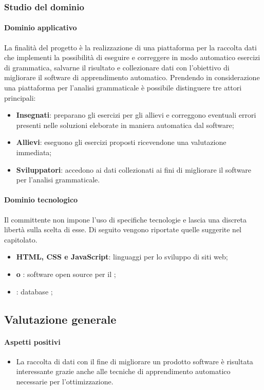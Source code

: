 	\subsubsection{Studio del dominio}
	\paragraph{Dominio applicativo} \Spazio
	La finalità del progetto è la realizzazione di una piattaforma per la raccolta dati che implementi la possibilità di eseguire e correggere in modo automatico esercizi di grammatica, salvarne il risultato e collezionare dati con l'obiettivo di migliorare il software di apprendimento automatico.
	Prendendo in considerazione una piattaforma per l'analisi grammaticale è possibile distinguere tre attori principali:
	\begin{itemize} 
	\item \textbf{Insegnati}: preparano gli esercizi per gli allievi e correggono eventuali errori presenti nelle soluzioni eleborate in maniera automatica dal software;
	\item \textbf{Allievi}: eseguono gli esercizi proposti ricevendone una valutazione immediata;
	\item \textbf{Sviluppatori}: accedono ai dati collezionati ai fini di migliorare il software per l'analisi grammaticale.
	\end{itemize}
	\paragraph{Dominio tecnologico} 
	Il committente non impone l'uso di specifiche tecnologie e lascia una discreta libertà sulla scelta di esse. Di seguito vengono riportate quelle suggerite nel capitolato.
	\begin{itemize}
		\item \textbf{HTML, CSS e JavaScript}: linguaggi per lo sviluppo di siti web;
		\item \textbf{ o }: software open source per il ;
		\item  \textbf{}: database ;
	\end{itemize}
  \subsection{Valutazione generale}
	\paragraph{Aspetti positivi}
		\begin{itemize}
			\item {La raccolta di dati con il fine di migliorare un prodotto software è risultata interessante grazie anche alle tecniche di apprendimento automatico necessarie per l'ottimizzazione.}
		\end{itemize} 
